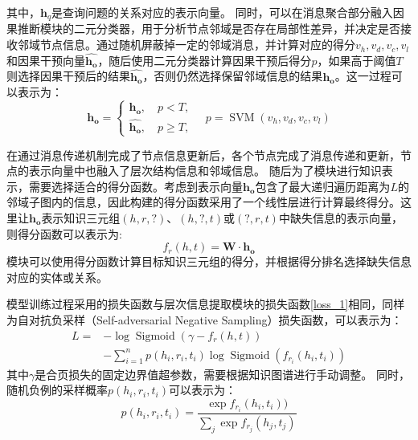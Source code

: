 \documentclass[algorithmlist, AutoFakeBold, AutoFakeSlant, figurelist, tablelist, nomlist, engineering]{seuthesix}
\begin{document}
其中，$\bm{h}_q$是查询问题的关系对应的表示向量。
同时，可以在消息聚合部分融入因果推断模块的二元分类器，用于分析节点邻域是否存在局部性差异，并决定是否接收邻域节点信息。通过随机屏蔽掉一定的邻域消息，并计算对应的得分$v_h, v_d, v_c, v_l$和因果干预向量$\bm{\hat{h_o}}$，随后使用二元分类器计算因果干预后得分$p$，如果高于阈值$T$则选择因果干预后的结果$\bm{\hat{h_o}}$，否则仍然选择保留邻域信息的结果$\bm{h_o}$。这一过程可以表示为：
\begin{equation}
  \bm{h_o} = \left\{\begin{array}{l}
  \bm{h_o},\quad p < T, \\
  \bm{\hat{h_o}},\quad p \geq T,
  \end{array} \quad p = \operatorname{SVM}\left(v_h, v_d, v_c, v_l\right)\right.
  \label{equation_finalMessagePassing}
\end{equation}

在通过消息传递机制完成了节点信息更新后，各个节点完成了消息传递和更新，节点的表示向量中也融入了层次结构信息和邻域信息。
随后为了模块进行知识表示，需要选择适合的得分函数。考虑到表示向量$\bm{h_o}$包含了最大递归遍历距离为$L$的邻域子图内的信息，因此构建的得分函数采用了一个线性层进行计算最终得分。这里让$\bm{h_o}$表示知识三元组$(h, r, ?)$、$(h, ?, t)$或$(?, r, t)$中缺失信息的表示向量，则得分函数可以表示为:
\begin{equation}
  f_{r}(h, t) = \mathbf{W} \cdot \bm{h_o}
  \label{equation_GNNScore}
\end{equation}
模块可以使用得分函数计算目标知识三元组的得分，并根据得分排名选择缺失信息对应的实体或关系。

模型训练过程采用的损失函数与层次信息提取模块的损失函数\ref{loss_1}相同，同样为自对抗负采样（Self-adversarial Negative Sampling）损失函数，可以表示为：
\begin{equation}
  \begin{aligned}
  L= & -\log \operatorname{Sigmoid}\left(\gamma-f_r(h, t)\right) \\
  & -\sum_{i=1}^n p\left(h_i, r_i, t_i\right) \log \operatorname{Sigmoid}(f_{r_i}(h_i, t_i))
  \end{aligned}
\end{equation}
其中$\gamma$是合页损失的固定边界值超参数，需要根据知识图谱进行手动调整。
同时，随机负例的采样概率$p(h_i, r_i, t_i)$可以表示为：
\begin{equation}
  p(h_i, r_i, t_i)=\frac{\exp f_{r_i}(h_i, t_i))}{\sum_j \exp f_{r_j}(h_j, t_j)}
\end{equation}
\end{document}
